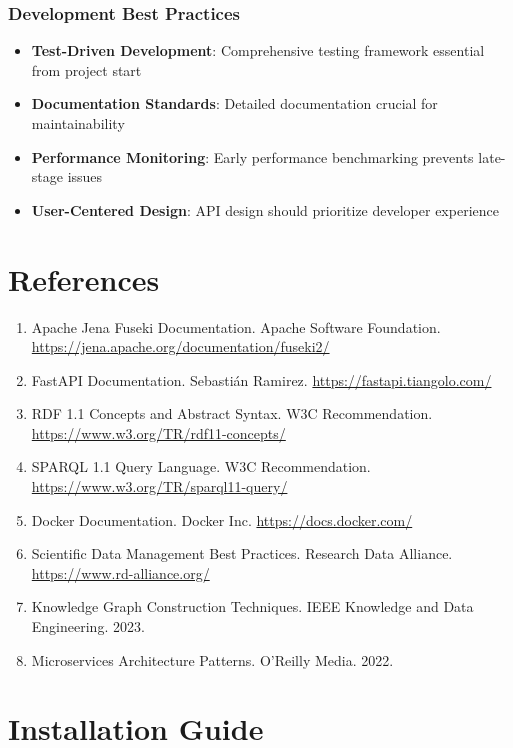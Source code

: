 \documentclass[12pt,a4paper]{article}
\begin{document}
\subsubsection{Development Best Practices}

\begin{itemize}
    \item \textbf{Test-Driven Development}: Comprehensive testing framework essential from project start
    \item \textbf{Documentation Standards}: Detailed documentation crucial for maintainability
    \item \textbf{Performance Monitoring}: Early performance benchmarking prevents late-stage issues
    \item \textbf{User-Centered Design}: API design should prioritize developer experience
\end{itemize}

\section{References}

\begin{enumerate}
    \item Apache Jena Fuseki Documentation. Apache Software Foundation. \url{https://jena.apache.org/documentation/fuseki2/}
    \item FastAPI Documentation. Sebastián Ramirez. \url{https://fastapi.tiangolo.com/}
    \item RDF 1.1 Concepts and Abstract Syntax. W3C Recommendation. \url{https://www.w3.org/TR/rdf11-concepts/}
    \item SPARQL 1.1 Query Language. W3C Recommendation. \url{https://www.w3.org/TR/sparql11-query/}
    \item Docker Documentation. Docker Inc. \url{https://docs.docker.com/}
    \item Scientific Data Management Best Practices. Research Data Alliance. \url{https://www.rd-alliance.org/}
    \item Knowledge Graph Construction Techniques. IEEE Knowledge and Data Engineering. 2023.
    \item Microservices Architecture Patterns. O'Reilly Media. 2022.
\end{enumerate}

\appendix

\section{Installation Guide}
\end{document}
